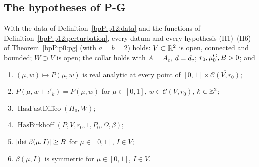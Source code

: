 \subsection{The hypotheses of P-G}\label{bpP:p12:sec-pg}

\begin{proposition}\label{bpP:p12:pg-hypotheses}
With the data of Definition~\ref{bpP:p12:data} and the functions of Definition~\ref{bpP:p12:perturbation}, every datum and every hypothesis (H1)--(H6) of Theorem~\ref{bpP:p0:pg} (with $a=b=2$) holds:
$V\subset\mathbb{R}^2$ is open, connected and bounded; $W\supset\overline V$ is open; the collar holds with $A=A_c$, $d=d_{\rm c}$; $r_0,\mu_0^{\rm G},B>0$; and
\begin{enumerate}[label=(H\arabic*)]
\item $(\mu,w)\mapsto P(\mu,w)$ is real analytic at every point of $[0,1]\times\overline{\mathcal C(V,r_0)}$;
\item $P(\mu,w+\iota'_k)=P(\mu,w)$ for $\mu\in[0,1]$, $w\in\mathcal C(V,r_0)$, $k\in\mathbb{Z}^2$;
\item $\operatorname{HasFastDiffeo}(H_0,W)$;
\item $\operatorname{HasBirkhoff}(P,V,r_0,1,P_0,\Omega,\beta)$;
\item $\lvert \det\beta(\mu,I)\rvert\ge B$ for $\mu\in[0,1]$, $I\in V$;
\item $\beta(\mu,I)$ is symmetric for $\mu\in[0,1]$, $I\in V$.
\end{enumerate}
\end{proposition}
